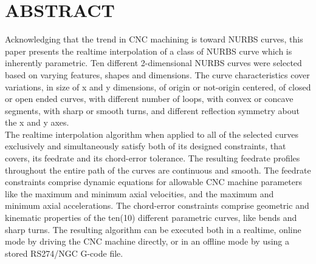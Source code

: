 \chapter{ABSTRACT}

\begin{singlespace}
	
\noindent
Acknowledging that the trend in CNC machining is toward NURBS curves, this paper presents the realtime interpolation of a class of NURBS curve which is inherently parametric. Ten different 2-dimensional NURBS curves were selected based on varying features, shapes and dimensions. The curve characteristics cover variations, in size of x and y dimensions, of origin or not-origin centered, of closed or open ended curves, with different number of loops, with convex or concave segments, with sharp or smooth turns, and different reflection symmetry about the x and y axes.\\

\noindent
The realtime interpolation algorithm when applied to all of the selected curves exclusively and simultaneously satisfy both of its designed constraints, that covers, its feedrate and its chord-error tolerance. The resulting feedrate profiles throughout the entire path of the curves are continuous and smooth. The feedrate constraints comprise dynamic equations for allowable CNC machine parameters like the maximum and minimum axial velocities, and the maximum and minimum axial accelerations. The chord-error constraints comprise geometric and kinematic properties of the ten(10) different parametric curves, like bends and sharp turns. The resulting algorithm can be executed both in a realtime, online mode by driving the CNC machine directly, or in an offline mode by using a stored RS274/NGC G-code file.

\end{singlespace}
